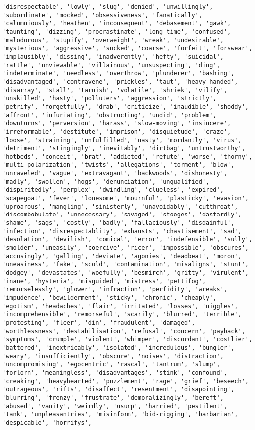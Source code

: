 \documentclass[11pt]{article}
\begin{document}
\begin{Verbatim}[commandchars=\\\{\}]
'disrespectable', 'lowly', 'slug', 'denied', 'unwillingly', 'subordinate', 'mocked', 'obsessiveness', 'fanatically', 'calumniously', 'heathen', 'inconsequent', 'debasement', 'gawk', 'taunting', 'dizzing', 'procrastinate', 'long-time', 'confused', 'malodorous', 'stupify', 'overweight', 'wreak', 'undesirable', 'mysterious', 'aggressive', 'sucked', 'coarse', 'forfeit', 'forswear', 'implausibly', 'dissing', 'inadverently', 'hefty', 'suicidal', 'rattle', 'unviewable', 'villainous', 'unsuspecting', 'ding', 'indeterminate', 'needless', 'overthrow', 'plunderer', 'bashing', 'disadvantaged', 'contravene', 'prickles', 'taut', 'heavy-handed', 'disarray', 'stall', 'tarnish', 'volatile', 'shriek', 'vilify', 'unskilled', 'hasty', 'polluters', 'aggression', 'strictly', 'petrify', 'forgetfully', 'drab', 'criticize', 'inaudible', 'shoddy', 'affront', 'infuriating', 'obstructing', 'undid', 'problem', 'downturns', 'perversion', 'harass', 'slow-moving', 'insincere', 'irreformable', 'destitute', 'imprison', 'disquietude', 'craze', 'loose', 'straining', 'unfulfilled', 'nasty', 'mordantly', 'virus', 'detriment', 'stingingly', 'inevitably', 'dirtbag', 'untrustworthy', 'hotbeds', 'conceit', 'brat', 'addicted', 'refute', 'worse', 'thorny', 'multi-polarization', 'twists', 'allegations', 'torment', 'blow', 'unraveled', 'vague', 'extravagant', 'backwoods', 'dishonesty', 'madly', 'swollen', 'hogs', 'denunciation', 'unqualified', 'dispiritedly', 'perplex', 'dwindling', 'clueless', 'expired', 'scapegoat', 'fever', 'lonesome', 'mournful', 'plasticky', 'evasion', 'uproarous', 'mangling', 'sinisterly', 'unavoidably', 'cutthroat', 'discombobulate', 'unnecessary', 'savaged', 'stooges', 'dastardly', 'shame', 'sags', 'costly', 'badly', 'fallaciously', 'disdainful', 'infection', 'disrespectablity', 'exhausts', 'chastisement', 'sad', 'desolation', 'devilish', 'comical', 'error', 'indefensible', 'sully', 'smolder', 'uneasily', 'coercive', 'ricer', 'impossible', 'obscures', 'accusingly', 'galling', 'deviate', 'agonies', 'deadbeat', 'moron', 'uneasiness', 'fake', 'scold', 'contamination', 'misaligns', 'stunt', 'dodgey', 'devastates', 'woefully', 'besmirch', 'gritty', 'virulent', 'inane', 'hysteria', 'misguided', 'mistress', 'pettifog', 'remorselessly', 'glower', 'infraction', 'perfidity', 'wreaks', 'impudence', 'bewilderment', 'sticky', 'chronic', 'cheaply', 'egotism', 'headaches', 'flair', 'irritated', 'losses', 'niggles', 'incomprehensible', 'remorseful', 'scarily', 'blurred', 'terrible', 'protesting', 'fleer', 'din', 'fraudulent', 'damaged', 'worthlessness', 'destabilisation', 'refusal', 'concern', 'payback', 'symptoms', 'crumple', 'violent', 'whimper', 'discordant', 'costlier', 'battered', 'inextricably', 'isolated', 'incredulous', 'bungler', 'weary', 'insufficiently', 'obscure', 'noises', 'distraction', 'uncompromising', 'egocentric', 'rascal', 'tantrum', 'slump', 'forlorn', 'meaningless', 'disadvantages', 'stink', 'confound', 'creaking', 'heavyhearted', 'puzzlement', 'rage', 'grief', 'beseech', 'outrageous', 'rifts', 'disaffect', 'resentment', 'disapointing', 'blurring', 'frenzy', 'frustrate', 'demoralizingly', 'bereft', 'abused', 'vanity', 'weirdly', 'usurp', 'harried', 'pestilent', 'tank', 'unpleasantries', 'misinform', 'bid-rigging', 'barbarian', 'despicable', 'horrifys', 
\end{Verbatim}
\end{document}
